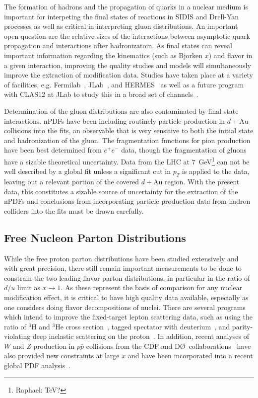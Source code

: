 The formation of hadrons and the propagation of quarks in a nuclear medium is important for interpeting the final states of reactions in SIDIS and Drell-Yan processes as well as critical in interpreting gluon distributions.  An important open question are the relative sizes of the interactions between asymptotic quark propagation and interactions after hadronizatoin.  As final states can reveal important information regarding the kinematics (such as Bjorken $x$) and flavor in a given interaction, improving the quality studies and models will simultaneously improve the extraction of modification data.  Studies have taken place at a variety of facilities, e.g. Fermilab~\cite{PhysRevC.75.035206}, JLab~\cite{PhysRevLett.99.242502, ELFASSI2012326}, and HERMES~\cite{Airapetian2011} as well as a future program with CLAS12 at JLab to study this in a broad set of channels~\cite{quarkformprop}.

Determination of the gluon distributions are also contaminated by final state interactions. nPDFs have been including routinely particle production in $d+\mathrm{Au}$ collisions into the fits, an observable that is very sensitive to both the initial state and hadronization of the gluon. The fragmentation functions for pion production have been best determined from $e^+e^-$ data, though the fragmentation of gluons have a sizable theoretical uncertainty. Data from the LHC at $7$~GeV\footnote{Raphael: TeV?} can not be well described by a global fit unless a significant cut in $p_{T}$ is applied to the data, leaving out a relevant portion of the covered $d+\mathrm{Au}$ region.  With the present data, this constitutes a sizable source of uncertainty for the extraction of the nPDFs and conclusions from incorporating particle production data from hadron colliders into the fits must be drawn carefully.

\subsection{Free Nucleon Parton Distributions}

While the free proton parton distributions have been studied extensively and with great precision, there still remain important measurements to be done to constrain the two leading-flavor parton distributions, in particular in the ratio of $d/u$ limit as $x \rightarrow 1$.  As these represent the basis of comparison for any nuclear modification effect, it is critical to have high quality data available, especially as one considers doing flavor decompositions of nuclei.  There are several programs which intend to improve the fixed-target lepton scattering data, such as using the ratio of ${}^{3}$H and ${}^{3}$He cross section~\cite{mar}, tagged spectator with deuterium~\cite{bonus12}, and parity-violating deep inelastic scattering on the proton~\cite{solid_pvdis}.  In addition, recent analyses of $W$ and $Z$ production in $p\bar{p}$ collisions from the CDF and D\O\ collaborations~\cite{D0:2014kma,Abazov:2013dsa,Acosta:2005ud,Aaltonen:2009ta,Aaltonen:2010zza,Abazov:2007jy} have also provided new constraints at large $x$ and have been incorporated into a recent global PDF analysis~\cite{Accardi:2016qay}.

